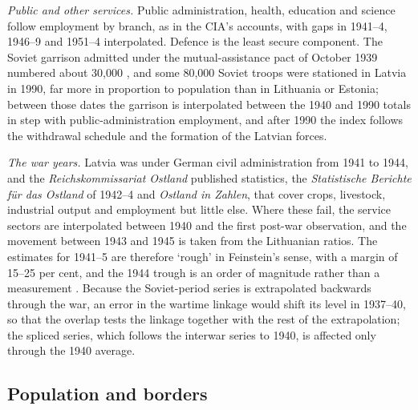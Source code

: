 \textit{Public and other services.} Public administration, health, education and science follow employment by branch, as in the CIA's accounts, with gaps in 1941--4, 1946--9 and 1951--4 interpolated. Defence is the least secure component. The Soviet garrison admitted under the mutual-assistance pact of October 1939 numbered about 30,000 \parencite[15--16]{years_of_dependence}, and some 80,000 Soviet troops were stationed in Latvia in 1990, far more in proportion to population than in Lithuania or Estonia; between those dates the garrison is interpolated between the 1940 and 1990 totals in step with public-administration employment, and after 1990 the index follows the withdrawal schedule and the formation of the Latvian forces.

\textit{The war years.} Latvia was under German civil administration from 1941 to 1944, and the \textit{Reichskommissariat Ostland} published statistics, the \textit{Statistische Berichte für das Ostland} of 1942--4 and \textit{Ostland in Zahlen}, that cover crops, livestock, industrial output and employment but little else. Where these fail, the service sectors are interpolated between 1940 and the first post-war observation, and the movement between 1943 and 1945 is taken from the Lithuanian ratios. The estimates for 1941--5 are therefore `rough' in Feinstein's sense, with a margin of 15--25 per cent, and the 1944 trough is an order of magnitude rather than a measurement \parencite[21]{feinstein1972}. Because the Soviet-period series is extrapolated backwards through the war, an error in the wartime linkage would shift its level in 1937--40, so that the overlap tests the linkage together with the rest of the extrapolation; the spliced series, which follows the interwar series to 1940, is affected only through the 1940 average.

\subsection{Population and borders}

